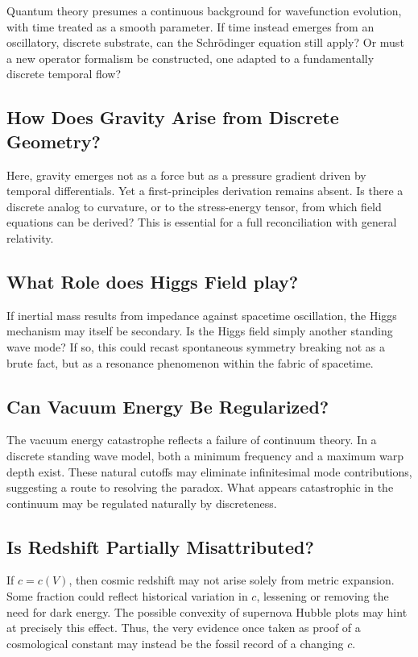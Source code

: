 \documentclass[12pt]{article}
\begin{document}
Quantum theory presumes a continuous background for wavefunction evolution, with time treated as a smooth parameter. If time instead emerges from an oscillatory, discrete substrate, can the Schrödinger equation still apply? Or must a new operator formalism be constructed, one adapted to a fundamentally discrete temporal flow?

\subsection{How Does Gravity Arise from Discrete Geometry?}

Here, gravity emerges not as a force but as a pressure gradient driven by temporal differentials. Yet a first-principles derivation remains absent. Is there a discrete analog to curvature, or to the stress-energy tensor, from which field equations can be derived? This is essential for a full reconciliation with general relativity.

\subsection{What Role does Higgs Field play?}

If inertial mass results from impedance against spacetime oscillation, the Higgs mechanism may itself be secondary. Is the Higgs field simply another standing wave mode? If so, this could recast spontaneous symmetry breaking not as a brute fact, but as a resonance phenomenon within the fabric of spacetime.

\subsection{Can Vacuum Energy Be Regularized?}

The vacuum energy catastrophe reflects a failure of continuum theory. In a discrete standing wave model, both a minimum frequency and a maximum warp depth exist. These natural cutoffs may eliminate infinitesimal mode contributions, suggesting a route to resolving the paradox. What appears catastrophic in the continuum may be regulated naturally by discreteness.

\subsection{Is Redshift Partially Misattributed?}

If $c = c(V)$, then cosmic redshift may not arise solely from metric expansion. Some fraction could reflect historical variation in $c$, lessening or removing the need for dark energy. The possible convexity of supernova Hubble plots may hint at precisely this effect. Thus, the very evidence once taken as proof of a cosmological constant may instead be the fossil record of a changing $c$.
\end{document}
